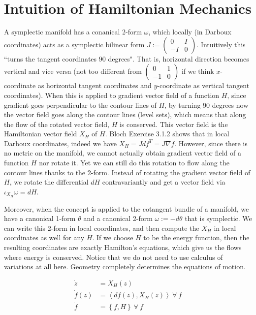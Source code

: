 \documentclass[12pt,class=article,crop=false]{standalone}
\begin{document}
\section{Intuition of Hamiltonian Mechanics}
A symplectic manifold has a conanical 2-form $ \omega$, which locally (in Darboux coordinates) acts as a symplectic bilinear form $J:= \begin{pmatrix} 0&I\\-I & 0 \end{pmatrix} $. Intuitively this ``turns the tangent coordinates 90 degrees". That is, horizontal direction becomes vertical and vice versa (not too different from $ \begin{pmatrix} 0&1\\-1&0 \end{pmatrix} $ if we think $ x$-coordinate as horizontal tangent coordinates and  $ y$-coordinate as vertical tangent coordinates). When this is applied to gradient vector field  of a function $ H$, since gradient goes perpendicular to the contour lines of $ H$, by turning 90 degrees now the vector field goes along the contour lines (level sets), which means that along the flow of the rotated vector field, $ H$ is conserved. This vector field is the Hamiltonian vector field $ X_H$ of  $ H$. Bloch Exercise 3.1.2 shows that in local Darboux coordinates, indeed we have $ X_H = J df^{T} = J \nabla f$. However, since there is no metric on the manifold, we cannot actually obtain gradient vector field of a function $ H$ nor rotate it. Yet we can still do this rotation to flow along the contour lines thanks to the 2-form. Instead of rotating the gradient vector field of $ H$, we rotate the differential $ dH$ contravariantly and get a vector field via $ \iota_{{X_H}} \omega = dH$.

Moreover, when the concept is applied to the cotangent bundle of a manifold, we have a canonical 1-form $ \theta$ and a canonical 2-form $ \omega := -d \theta$ that is symplectic. We can write this 2-form in local coordinates, and then compute the $ X_H$ in local coordinates as well for any $ H$. If we choose $ H$ to be the energy function, then the resulting coordinates are exactly Hamilton's equations, which give us the flows where energy is conserved. Notice that we do not need to use calculus of variations at all here. Geometry completely determines the equations of motion.

\begin{align*}
	\dot{z} &= X_H(z) \\
	\dot{f}(z) &= \left\langle df(z), X_H(z) \right\rangle \ \forall \ f\\
	\dot{f} &= \left\{ f,H \right\} \ \forall \ f
\end{align*}
\end{document}

